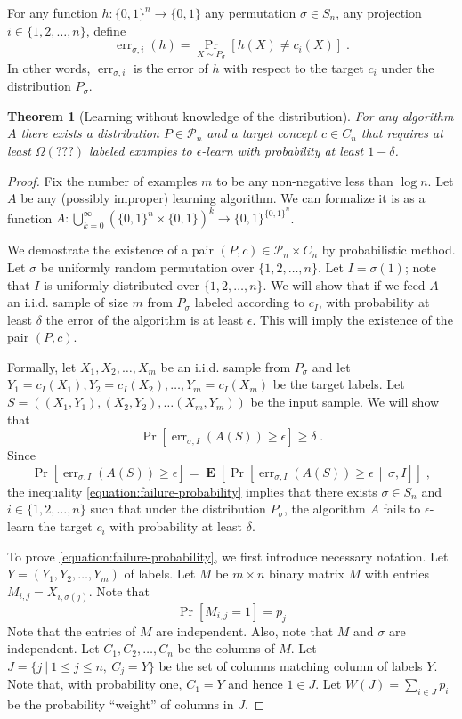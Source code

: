 \documentclass[10pt]{article}
\newtheorem{theorem}[proposition]{Theorem}
\renewcommand{\P}{\mathcal{P}}
\DeclareMathOperator{\err}{err}
\DeclareMathOperator{\Exp}{\mathbf{E}}
\begin{document}
For any function $h:\{0,1\}^n \to \{0,1\}$ any permutation $\sigma \in S_n$, any
projection $i \in \{1,2,\dots,n\}$, define
$$
\err_{\sigma,i}(h) = \Pr_{X \sim P_{\sigma}}[h(X) \neq c_i(X)] \; .
$$
In other words, $\err_{\sigma,i}$ is the error of $h$ with respect to the target
$c_i$ under the distribution $P_{\sigma}$.

\begin{theorem}[Learning without knowledge of the distribution]
For any algorithm $A$ there exists a distribution $P \in \P_n$
and a target concept $c \in C_n$ that requires at least $\Omega \left(??? \right)$
labeled examples to $\epsilon$-learn with probability at least $1 - \delta$.
\end{theorem}

\begin{proof}
Fix the number of examples $m$ to be any non-negative less than $\log n$. Let $A$
be any (possibly improper) learning algorithm. We can formalize it is as a
function $A:\bigcup_{k=0}^\infty (\{0,1\}^n \times \{0,1\})^k \to
\{0,1\}^{\{0,1\}^n}$.

We demostrate the existence of a pair $(P,c) \in \P_n \times C_n$ by
probabilistic method. Let $\sigma$ be uniformly random permutation over
$\{1,2,\dots,n\}$. Let $I = \sigma(1)$; note that $I$ is uniformly distributed
over $\{1,2,\dots,n\}$. We will show that if we feed $A$ an i.i.d. sample of
size $m$ from $P_\sigma$ labeled according to $c_I$, with probability at least
$\delta$ the error of the algorithm is at least $\epsilon$. This will imply
the existence of the pair $(P,c)$.

Formally, let $X_1, X_2, \dots, X_m$ be an i.i.d. sample from $P_{\sigma}$ and
let $Y_1 = c_I(X_1), Y_2 = c_I(X_2), \dots, Y_m = c_I(X_m)$ be the target labels.
Let $S = ((X_1, Y_1), (X_2, Y_2), \dots (X_m, Y_m))$ be the input sample.
We will show that
\begin{equation}
\label{equation:failure-probability}
\Pr \left[\err_{\sigma,I}(A(S)) \ge \epsilon \right] \ge \delta \; .
\end{equation}
Since
$$
\Pr \left[\err_{\sigma,I}(A(S)) \ge \epsilon \right] = \Exp\left[ \Pr \left[\err_{\sigma,I}(A(S)) \ge \epsilon \, \middle| \, \sigma, I \right] \right] \; ,
$$
the inequality \eqref{equation:failure-probability} implies that there
exists $\sigma \in S_n$ and $i \in \{1,2,\dots,n\}$ such that under the
distribution $P_\sigma$, the algorithm $A$ fails to $\epsilon$-learn the target
$c_i$ with probability at least $\delta$.

To prove \eqref{equation:failure-probability}, we first introduce
necessary notation. Let $Y = (Y_1, Y_2, \dots, Y_m)$ of labels.
Let $M$ be $m \times n$ binary matrix $M$ with entries
$M_{i,j} = X_{i,\sigma(j)}$. Note that
$$
\Pr[M_{i,j} = 1] = p_j
$$
Note that the entries of $M$ are independent. Also, note that $M$ and $\sigma$
are independent. Let $C_1, C_2, \dots, C_n$ be the columns of $M$. Let $J = \{ j ~|~
1 \le j \le n, \ C_j = Y \}$ be the set of columns matching column of labels
$Y$. Note that, with probability one, $C_1 = Y$ and hence $1 \in J$.
Let $W(J) = \sum_{i \in J} p_i$ be the probability ``weight'' of columns in $J$.


\end{proof}
\end{document}
